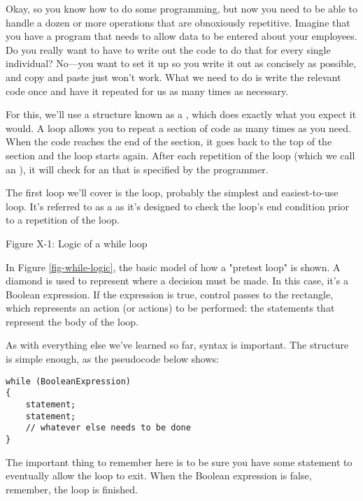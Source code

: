 
Okay, so you know how to do some programming, but now you need to be able to handle a dozen or more operations that are obnoxiously repetitive.
Imagine that you have a program that needs to allow data to be entered about your employees.
Do you really want to have to write out the code to do that for every single individual?
No---you want to set it up so you write it out as concisely as possible, and copy and paste just won't work.
What we need to do is write the relevant code once and have it repeated for us as many times as necessary.

For this, we’ll use a structure known as a , which does exactly what you expect it would.
A loop allows you to repeat a section of code as many times as you need.
When the code reaches the end of the section, it goes back to the top of the section and the loop starts again.
After each repetition of the loop (which we call an ), it will check for an  that is specified by the programmer. 


The first loop we’ll cover is the  loop, probably the simplest and easiest-to-use loop.
It’s referred to as a  as it’s designed to check the loop’s end condition prior to a repetition of the loop.

Figure X-1: Logic of a while loop
\label{fig-while-logic}

In Figure \ref{fig-while-logic}, the basic model of how a "pretest loop" is shown.
A diamond is used to represent where a decision must be made.
In this case, it’s a Boolean expression.
If the expression is true, control passes to the rectangle, which represents an action (or actions) to be performed: the statements that represent the body of the loop.

As with everything else we’ve learned so far, syntax is important. The structure is simple enough, as the pseudocode below shows:

\begin{lstlisting}
while (BooleanExpression)
{
	statement;
	statement;
	// whatever else needs to be done
}
\end{lstlisting}

The important thing to remember here is to be sure you have some statement to eventually allow the loop to exit.
When the Boolean expression is false, remember, the loop is finished.

